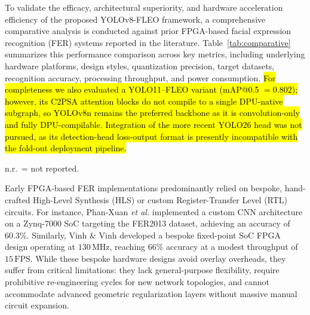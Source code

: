 \documentclass[algorithms,article,submit,moreauthors]{Definitions/mdpi}
\newcommand{\rev}[1]{\hl{#1}}        %
\begin{document}
To validate the efficacy, architectural superiority, and hardware acceleration efficiency of the proposed YOLOv8-FLEO framework, a comprehensive comparative analysis is conducted against prior FPGA-based facial expression recognition (FER) systems reported in the literature. Table~\ref{tab:comparative} summarizes this performance comparison across key metrics, including underlying hardware platforms, design styles, quantization precision, target datasets, recognition accuracy, processing throughput, and power consumption. \rev{For completeness we also evaluated a YOLO11--FLEO variant (mAP@0.5 \mbox{$=0.802$}); however, its C2PSA attention blocks do not compile to a single DPU-native subgraph, so YOLOv8n remains the preferred backbone as it is convolution-only and fully DPU-compilable. Integration of the more recent YOLO26 head was not pursued, as its detection-head loss-output format is presently incompatible with the fold-out deployment pipeline.}

\begin{table}[h!]
\centering
\caption{Comparative Study with prior FPGA-based facial expression recognition systems.}
\label{tab:comparative}
\begin{tablenotes}[flushleft]\footnotesize
\item n.r.\ = not reported.
\end{tablenotes}
\end{table}

Early FPGA-based FER implementations predominantly relied on bespoke, hand-crafted High-Level Synthesis (HLS) or custom Register-Transfer Level (RTL) circuits. For instance, Phan-Xuan \textit{et al.}\citep{bib12} implemented a custom CNN architecture on a Zynq-7000 SoC targeting the FER2013 dataset, achieving an accuracy of $60.3\%$. Similarly, Vinh \& Vinh \citep{bib13} developed a bespoke fixed-point SoC FPGA design operating at $130\,\text{MHz}$, reaching $66\%$ accuracy at a modest throughput of $15\,\text{FPS}$. While these bespoke hardware designs avoid overlay overheads, they suffer from critical limitations: they lack general-purpose flexibility, require prohibitive re-engineering cycles for new network topologies, and cannot accommodate advanced geometric regularization layers without massive manual circuit expansion.
\end{document}
